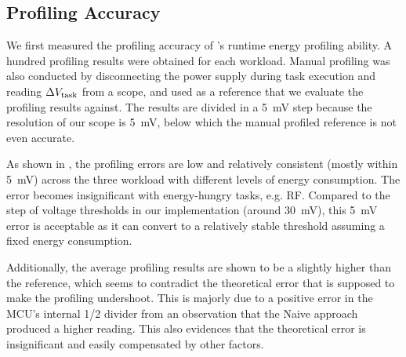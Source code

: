 

\subsection{Profiling Accuracy}



We first measured the profiling accuracy of \nn{}'s runtime energy profiling ability. 
A hundred profiling results were obtained for each workload. 
Manual profiling was also conducted by disconnecting the power supply during task execution and reading $\Delta V_{\text{task}}$ from a scope, and used as a reference that we evaluate the profiling results against. 
The results are divided in a \SI{5}{\milli\volt} step because the resolution of our scope is \SI{5}{\milli\volt}, below which the manual profiled reference is not even accurate. 

As shown in , the profiling errors are low and relatively consistent (mostly within \SI{5}{\milli\volt}) across the three workload with different levels of energy consumption. 
The error becomes insignificant with energy-hungry tasks, e.g. RF. 
Compared to the step of voltage thresholds in our implementation (around \SI{30}{\milli\volt}), this \SI{5}{\milli\volt} error is acceptable as it can convert to a relatively stable threshold assuming a fixed energy consumption. 

Additionally, the average profiling results are shown to be a slightly higher than the reference, which 
seems to contradict the theoretical error that is supposed to make the profiling undershoot.
This is majorly due to a positive error in the MCU's internal 1/2  divider from an observation that the Naive approach produced a higher reading. 
This also evidences that the theoretical error is insignificant and easily compensated by other factors. 

